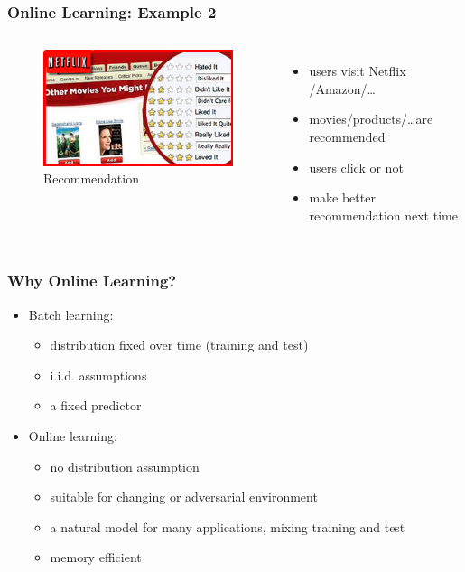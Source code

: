 \documentclass{beamer}
\begin{document}
\begin{frame}
\frametitle{Online Learning: Example 2}
\begin{columns}
\begin{figure}
\includegraphics[scale = 0.4]{recommendation}
\caption{Recommendation}
\end{figure}
\begin{itemize}
\item users visit Netflix /Amazon/\ldots
\pause
\item movies/products/\ldots are recommended 
\pause
\item users {\color{blue}click or not}
\pause
\item make better recommendation next time   
\end{itemize}

\end{columns}


\end{frame}

\begin{frame}
\frametitle{Why Online Learning?}
\begin{itemize}
\item Batch learning:
\begin{itemize}
\item distribution fixed over time (training and test)
\item i.i.d. assumptions
\item a fixed predictor 
\end{itemize}
\pause
\item Online learning:
\begin{itemize}
\item no distribution assumption
\item suitable for changing or adversarial environment  
\item a natural model for many applications, mixing training and test 
\item memory efficient
\end{itemize}
\end{itemize}
\end{frame}
\end{document}
